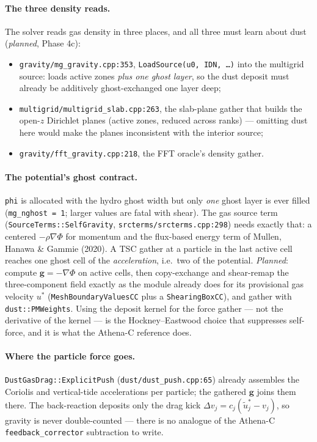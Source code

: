 \documentclass[11pt]{article}
\newcommand{\code}[1]{\texttt{#1}}
\newcommand{\file}[1]{\texttt{\small #1}}
\newcommand{\fn}[1]{\texttt{\small #1}}
\begin{document}
\paragraph{The three density reads.} The solver reads gas density in three places,
and all three must learn about dust (\emph{planned}, Phase 4c):
\begin{itemize}\itemsep2pt
  \item \file{gravity/mg\_gravity.cpp:353}, \fn{LoadSource(u0, IDN, \ldots)} into the
        multigrid source: loads active zones \emph{plus one ghost layer}, so the dust
        deposit must already be additively ghost-exchanged one layer deep;
  \item \file{multigrid/multigrid\_slab.cpp:263}, the slab-plane gather that builds the
        open-$z$ Dirichlet planes (active zones, reduced across ranks) --- omitting dust
        here would make the planes inconsistent with the interior source;
  \item \file{gravity/fft\_gravity.cpp:218}, the FFT oracle's density gather.
\end{itemize}

\paragraph{The potential's ghost contract.} \code{phi} is allocated with the hydro
ghost width but only \emph{one} ghost layer is ever filled
(\code{mg\_nghost = 1}; larger values are fatal with shear). The gas source term
(\fn{SourceTerms::SelfGravity}, \file{srcterms/srcterms.cpp:298}) needs exactly
that: a centered $-\rho\nabla\Phi$ for momentum and the flux-based energy term of
Mullen, Hanawa \& Gammie (2020). A TSC gather at a particle in the last active cell
reaches one ghost cell of the \emph{acceleration}, i.e.\ two of the potential.
\emph{Planned}: compute $\mathbf g = -\nabla\Phi$ on active cells, then copy-exchange
and shear-remap the three-component field exactly as the module already does for its
provisional gas velocity $u^\ast$ (\code{MeshBoundaryValuesCC} plus a
\code{ShearingBoxCC}), and gather with \fn{dust::PMWeights}. Using the deposit kernel
for the force gather --- not the derivative of the kernel --- is the
Hockney--Eastwood choice that suppresses self-force, and it is what the Athena-C
reference does.

\paragraph{Where the particle force goes.} \fn{DustGasDrag::ExplicitPush}
(\file{dust/dust\_push.cpp:65}) already assembles the Coriolis and vertical-tide
accelerations per particle; the gathered $\mathbf g$ joins them there. The
back-reaction deposits only the drag kick $\Delta v_j = c_j(\tilde u^\ast_j - v_j)$,
so gravity is never double-counted --- there is no analogue of the Athena-C
\fn{feedback\_corrector} subtraction to write.
\end{document}
